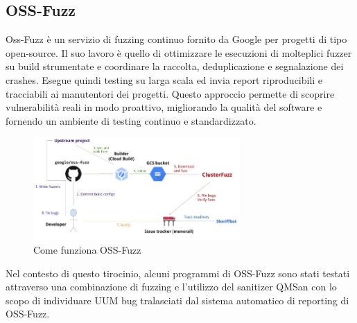 \subsection{OSS-Fuzz}

Oss-Fuzz è un servizio di fuzzing continuo fornito da Google per progetti di tipo open-source. Il suo lavoro è quello di ottimizzare le esecuzioni di molteplici fuzzer su build strumentate e coordinare la raccolta, deduplicazione e segnalazione dei crashes. Esegue quindi testing su larga scala ed invia report riproducibili e tracciabili ai manutentori dei progetti. Questo approccio permette di scoprire vulnerabilità reali in modo proattivo, migliorando la qualità del software e fornendo un ambiente di testing continuo e standardizzato. 

\begin{figure}[htbp]        
  \centering               
  \includegraphics[width=0.7\textwidth]{immagini/oss-fuzz.jpg}  
  \caption{Come funziona OSS-Fuzz}  
  \label{fig:oss-fuzz}      
\end{figure}

Nel contesto di questo tirocinio, alcuni programmi di OSS-Fuzz sono stati testati attraverso una combinazione di fuzzing e l’utilizzo del sanitizer QMSan con lo scopo di individuare UUM bug tralasciati dal sistema automatico di reporting di OSS-Fuzz.
